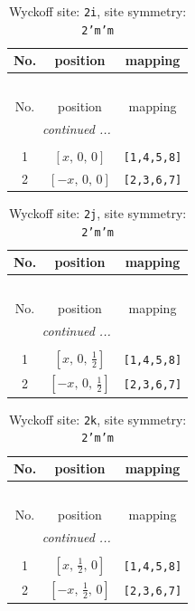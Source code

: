 \documentclass[fleqn,8pt]{jsarticle}
\begin{document}
\renewcommand{\arraystretch}{1.2}
\begin{longtable}{ccc}
\caption{Wyckoff site: {\tt 2i}, site symmetry: {\tt 2'm'm}}
 \\
 \hline \hline
No. & position & mapping \\ \hline \endfirsthead

\multicolumn{2}{l}{\tablename\ \thetable{}} \\
 \hline \hline
No. & position & mapping \\ \hline \endhead

 \hline \hline
\multicolumn{2}{r}{\footnotesize\it continued ...} \\ \endfoot

 \hline \hline
\multicolumn{2}{r}{} \\ \endlastfoot

1 & $\left[ x,\, 0,\, 0 \right]$ & {\tt [1,4,5,8]} \\ \hline
2 & $\left[ - x,\, 0,\, 0 \right]$ & {\tt [2,3,6,7]} \\
\end{longtable}
\renewcommand{\arraystretch}{1.2}
\begin{longtable}{ccc}
\caption{Wyckoff site: {\tt 2j}, site symmetry: {\tt 2'm'm}}
 \\
 \hline \hline
No. & position & mapping \\ \hline \endfirsthead

\multicolumn{2}{l}{\tablename\ \thetable{}} \\
 \hline \hline
No. & position & mapping \\ \hline \endhead

 \hline \hline
\multicolumn{2}{r}{\footnotesize\it continued ...} \\ \endfoot

 \hline \hline
\multicolumn{2}{r}{} \\ \endlastfoot

1 & $\left[ x,\, 0,\, \frac{1}{2} \right]$ & {\tt [1,4,5,8]} \\ \hline
2 & $\left[ - x,\, 0,\, \frac{1}{2} \right]$ & {\tt [2,3,6,7]} \\
\end{longtable}
\renewcommand{\arraystretch}{1.2}
\begin{longtable}{ccc}
\caption{Wyckoff site: {\tt 2k}, site symmetry: {\tt 2'm'm}}
 \\
 \hline \hline
No. & position & mapping \\ \hline \endfirsthead

\multicolumn{2}{l}{\tablename\ \thetable{}} \\
 \hline \hline
No. & position & mapping \\ \hline \endhead

 \hline \hline
\multicolumn{2}{r}{\footnotesize\it continued ...} \\ \endfoot

 \hline \hline
\multicolumn{2}{r}{} \\ \endlastfoot

1 & $\left[ x,\, \frac{1}{2},\, 0 \right]$ & {\tt [1,4,5,8]} \\ \hline
2 & $\left[ - x,\, \frac{1}{2},\, 0 \right]$ & {\tt [2,3,6,7]} \\
\end{longtable}
\end{document}
